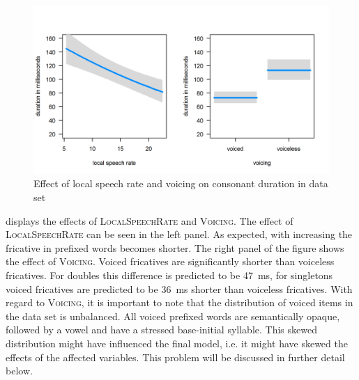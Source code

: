 \begin{figure}
	
	\includegraphics[scale=.8] {images/Corpus/disModelcov.png}
	\caption{ Effect of local speech rate and voicing on consonant duration in data set}
	\label{fig:corpus covariates dis}
\end{figure}


 displays the effects of \textsc{LocalSpeechRate} and \textsc{Voicing}. The effect of \textsc{LocalSpeechRate} can be seen in the left panel. As expected, with increasing  the fricative in prefixed words becomes shorter. 
The right panel of the figure shows the effect of \textsc{Voicing}. Voiced fricatives are significantly shorter than voiceless fricatives. For doubles this difference is predicted to be 47~ms, for singletons voiced fricatives are predicted to be 36~ms shorter than voiceless fricatives. 
With regard to \textsc{Voicing}, it is important to note that the distribution of voiced items in the data set is unbalanced. All voiced prefixed words are semantically opaque, followed by a vowel and have a stressed base-initial syllable. This skewed distribution might have influenced the final model, i.e. it might have skewed the effects of the affected variables. This problem will be discussed in further detail below.

